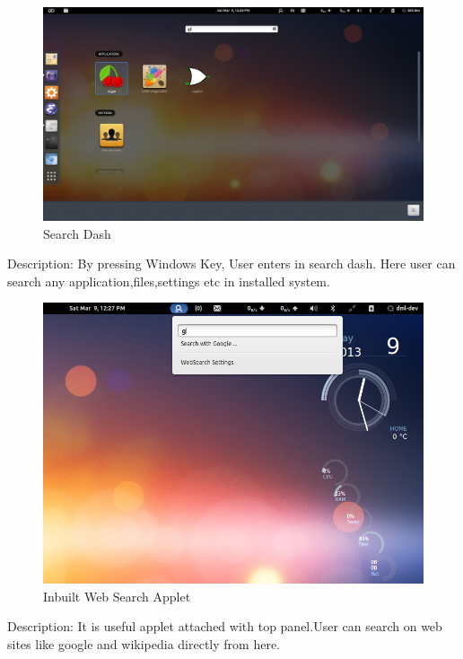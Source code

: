 \newpage
\begin{figure}[h]
\begin{center}
  \includegraphics[scale=0.35] {3.png}
  \caption[Screenshot - Search Dash in DMLinux]{Search Dash}
\end{center}
\end{figure}
Description: By pressing Windows Key, User enters in search dash. Here user can search any application,files,settings etc in installed system.

\newpage


\begin{figure}[h]
\begin{center}
  \includegraphics[scale=0.4] {4.png}
  \caption[Screenshot - Web search Applet]{Inbuilt Web Search Applet}
\end{center}
\end{figure}
Description: It is useful applet attached with top panel.User can search on web sites like google and wikipedia directly from here.

